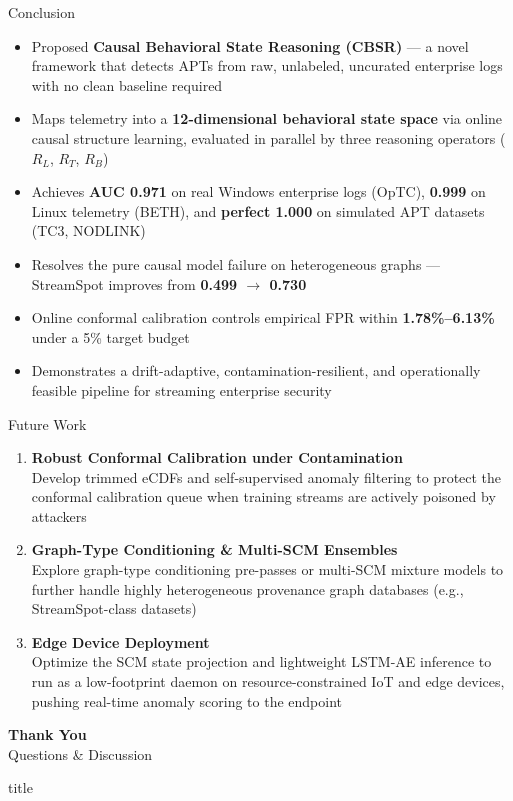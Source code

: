 \documentclass[aspectratio=169]{beamer}
\begin{document}
\begin{frame}{Conclusion}
  \begin{itemize}\setlength\itemsep{6pt}
    \item Proposed \textbf{Causal Behavioral State Reasoning (CBSR)} — a novel framework that detects APTs from raw, unlabeled, uncurated enterprise logs with no clean baseline required
    \item Maps telemetry into a \textbf{12-dimensional behavioral state space} via online causal structure learning, evaluated in parallel by three reasoning operators ($R_L$, $R_T$, $R_B$)
    \item Achieves \textbf{AUC 0.971} on real Windows enterprise logs (OpTC), \textbf{0.999} on Linux telemetry (BETH), and \textbf{perfect 1.000} on simulated APT datasets (TC3, NODLINK)
    \item Resolves the pure causal model failure on heterogeneous graphs — StreamSpot improves from \textbf{0.499 $\to$ 0.730}
    \item Online conformal calibration controls empirical FPR within \textbf{1.78\%--6.13\%} under a 5\% target budget
    \item Demonstrates a drift-adaptive, contamination-resilient, and operationally feasible pipeline for streaming enterprise security
  \end{itemize}
\end{frame}

\begin{frame}{Future Work}
  \begin{enumerate}\setlength\itemsep{10pt}
    \item \textbf{Robust Conformal Calibration under Contamination}\\
      \small Develop trimmed eCDFs and self-supervised anomaly filtering to protect the conformal calibration queue when training streams are actively poisoned by attackers

    \item \textbf{Graph-Type Conditioning \& Multi-SCM Ensembles}\\
      \small Explore graph-type conditioning pre-passes or multi-SCM mixture models to further handle highly heterogeneous provenance graph databases (e.g., StreamSpot-class datasets)

    \item \textbf{Edge Device Deployment}\\
      \small Optimize the SCM state projection and lightweight LSTM-AE inference to run as a low-footprint daemon on resource-constrained IoT and edge devices, pushing real-time anomaly scoring to the endpoint
  \end{enumerate}
\end{frame}

\begin{frame}[plain]
  \vfill
  \centering
  {\Huge \textbf{Thank You}}\\[1em]
  {\large Questions \& Discussion}\\[2em]
  \begin{beamercolorbox}[sep=8pt,center,rounded=true]{title}
    \small\inserttitle
  \end{beamercolorbox}
  \vfill
\end{frame}
\end{document}
